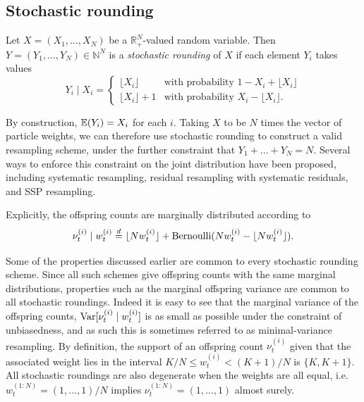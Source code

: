  
 

\subsection{Stochastic rounding}
\label{sec:SRs}

\begin{defn}\label{defn:stochround}
 Let $X=(X_1,\dots,X_N)$ be a $\mathbb{R}_+^N$-valued random variable. Then $Y=(Y_1,\dots,Y_N) \in \mathbb{N}^N$ is a \emph{stochastic rounding} of $X$ if each element $Y_i$ takes values
\begin{equation*}
Y_i \mid X_i =
\begin{cases}
 \lfloor X_i \rfloor & \text{with probability } 1- X_i+ \lfloor X_i \rfloor \\
  \lfloor X_i \rfloor +1 & \text{with probability } X_i- \lfloor X_i \rfloor .
\end{cases}
\end{equation*}
\end{defn}

By construction, $\mathbb{E}(Y_i) = X_i$ for each $i$. Taking $X$ to be $N$ times the vector of particle weights, we can therefore use stochastic rounding to construct a valid resampling scheme, under the further constraint that $Y_1 + \dots + Y_N = N$.
Several ways to enforce this constraint on the joint distribution have been proposed, including systematic resampling, residual resampling with systematic residuals, and SSP resampling.

Explicitly, the offspring counts are marginally distributed according to 
\begin{equation*}
\nu_t^{(i)} \mid w_t^{(i)}
\overset{d}{=} \lfloor N w_t^{(i)} \rfloor + \operatorname{Bernoulli}( Nw_t^{(i)} - \lfloor N w_t^{(i)} \rfloor ) .
\end{equation*}

Some of the properties discussed earlier are common to every stochastic rounding scheme. 
Since all such schemes give offspring counts with the same marginal distributions, properties such as the marginal offspring variance are common to all stochastic roundings. Indeed it is easy to see that the marginal variance of the offspring counts, $\operatorname{Var}[ \nu_t^{(i)} \mid w_t^{(i)} ]$ is as small as possible under the constraint of unbiasedness, and as such this is sometimes referred to as minimal-variance resampling.
By definition, the support of an offspring count $\nu_t^{(i)}$ given that the associated weight lies in the interval $K/N \leq w_t^{(i)} < (K+1)/N$ is $\{ K, K+1\}$. 
All stochastic roundings are also degenerate when the weights are all equal, i.e.\ $w_t^{(1:N)} = (1,\dots, 1)/N$ implies $\nu_t^{(1:N)}=(1,\dots,1)$ almost surely.





